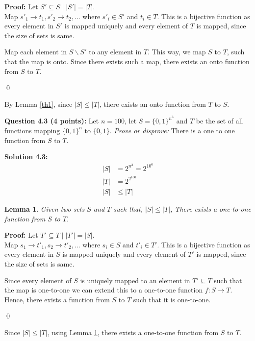 \documentclass[11pt]{article}
\newtheorem{lemma}[theorem]{Lemma}
\begin{document}
\textbf{Proof:} Let $S' \subseteq S \mid |S'| = |T|$. \\

Map ${s'}_1 \rightarrow t_1, {s'}_2 \rightarrow t_2, \dots$ where 
${s'}_i \in S'$ and $t_i \in T$. This is a bijective function as every
element in $S'$ is mapped uniquely and every element of $T$ is mapped, since
the size of sets is same.

Map each element in $S\backslash S'$ to any element in $T$. This way, we map $S$ to $T$,
such that the map is onto. Since there exists such a map,
there exists an onto function from $S$ to $T$. 

\qed

By Lemma \ref{th1}, since $|S| \le |T|$, there exists an onto
function from $T$ to $S$.

\textbf{Question 4.3 (4 points):} Let \(n=100\), let
\(S = \{0,1\}^{n^3}\) and \(T\) be the set of all functions mapping
\(\{0,1\}^n\) to \(\{0,1\}\). \emph{Prove or disprove:} There is a one
to one function from \(S\) to \(T\).

\textbf{Solution 4.3:}
\begin{align*}
    |S| &= 2^{n^{3}} = 2^{10^{6}}\\
    |T| &= 2^{2^{100}}\\
    |S| &\le |T|
\end{align*}

\begin{lemma}
    \label{th2}
    Given two sets $S$ and $T$ such that, $|S| \le |T|$, There exists a
    one-to-one function from $S$ to $T$.
\end{lemma}

\textbf{Proof:} Let $T' \subseteq T \mid |T'| = |S|$. \\

Map $s_1 \rightarrow {t'}_1, s_2 \rightarrow {t'}_2, \dots$ where 
$s_i \in S$ and ${t'}_i \in T'$. This is a bijective function as every
element in $S$ is mapped uniquely and every element of $T'$ is mapped, since
the size of sets is same.

Since every element of $S$ is uniquely mapped to an element in $T' \subseteq T$
such that the map is one-to-one we can extend this to a one-to-one
function $f: S \rightarrow T$. Hence, there exists a function from $S$ to $T$
such that it is one-to-one.

\qed

Since $|S| \le |T|$, using Lemma \ref{th2}, there exists a one-to-one function
from $S$ to $T$.
\end{document}
